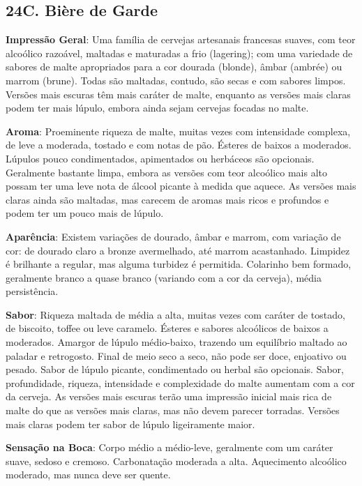 \subsection*{24C. Bière de Garde}
\textbf{Impressão Geral}: Uma família de cervejas artesanais francesas suaves, com teor alcoólico razoável, maltadas e maturadas a frio (lagering); com uma variedade de sabores de malte apropriados para a cor dourada (blonde), âmbar (ambrée) ou marrom (brune). Todas são maltadas, contudo, são secas e com sabores limpos. Versões mais escuras têm mais caráter de malte, enquanto as versões mais claras podem ter mais lúpulo, embora ainda sejam cervejas focadas no malte.

\textbf{Aroma}: Proeminente riqueza de malte, muitas vezes com intensidade complexa, de leve a moderada, tostado e com notas de pão. Ésteres de baixos a moderados. Lúpulos pouco condimentados, apimentados ou herbáceos são opcionais. Geralmente bastante limpa, embora as versões com teor alcoólico mais alto possam ter uma leve nota de álcool picante à medida que aquece. As versões mais claras ainda são maltadas, mas carecem de aromas mais ricos e profundos e podem ter um pouco mais de lúpulo.

\textbf{Aparência}: Existem variações de dourado, âmbar e marrom, com variação de cor: de dourado claro a bronze avermelhado, até marrom acastanhado. Limpidez é brilhante a regular, mas alguma turbidez é permitida. Colarinho bem formado, geralmente branco a quase branco (variando com a cor da cerveja), média persistência.

\textbf{Sabor}: Riqueza maltada de média a alta, muitas vezes com caráter de tostado, de biscoito, toffee ou leve caramelo. Ésteres e sabores alcoólicos de baixos a moderados. Amargor de lúpulo médio-baixo, trazendo um equilíbrio maltado ao paladar e retrogosto. Final de meio seco a seco, não pode ser doce, enjoativo ou pesado. Sabor de lúpulo picante, condimentado ou herbal são opcionais. Sabor, profundidade, riqueza, intensidade e complexidade do malte aumentam com a cor da cerveja. As versões mais escuras terão uma impressão inicial mais rica de malte do que as versões mais claras, mas não devem parecer torradas. Versões mais claras podem ter sabor de lúpulo ligeiramente maior.

\textbf{Sensação na Boca}: Corpo médio a médio-leve, geralmente com um caráter suave, sedoso e cremoso. Carbonatação moderada a alta. Aquecimento alcoólico moderado, mas nunca deve ser quente.

